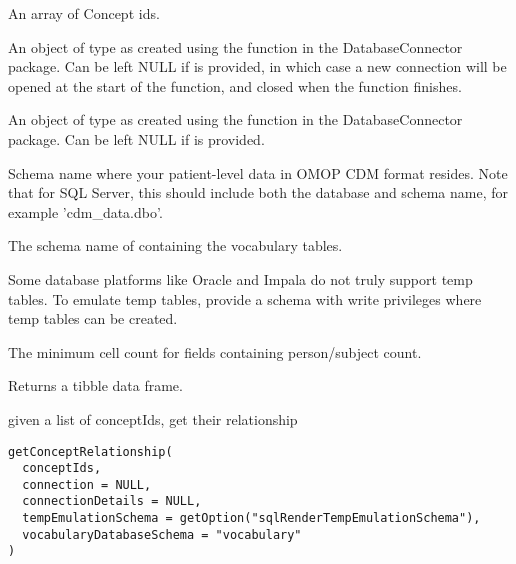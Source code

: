 \documentclass[a4paper]{book}
\begin{document}
\begin{Arguments}
\begin{ldescription}
\item[\code{conceptIds}] An array of Concept ids.

\item[\code{connection}] An object of type  as created using the
 function in the
DatabaseConnector package. Can be left NULL if 
is provided, in which case a new connection will be opened at the start
of the function, and closed when the function finishes.

\item[\code{connectionDetails}] An object of type  as created using the
 function in the
DatabaseConnector package. Can be left NULL if  is
provided.

\item[\code{cdmDatabaseSchema}] Schema name where your patient-level data in OMOP CDM format resides.
Note that for SQL Server, this should include both the database and
schema name, for example 'cdm\_data.dbo'.

\item[\code{vocabularyDatabaseSchema}] The schema name of containing the vocabulary tables.

\item[\code{tempEmulationSchema}] Some database platforms like Oracle and Impala do not truly support temp tables. To emulate temp 
tables, provide a schema with write privileges where temp tables can be created.

\item[\code{minCellCount}] The minimum cell count for fields containing person/subject count.
\end{ldescription}
\end{Arguments}
%
\begin{Value}
Returns a tibble data frame.
\end{Value}
%
\begin{Description}\relax
given a list of conceptIds, get their relationship
\end{Description}
%
\begin{Usage}
\begin{verbatim}
getConceptRelationship(
  conceptIds,
  connection = NULL,
  connectionDetails = NULL,
  tempEmulationSchema = getOption("sqlRenderTempEmulationSchema"),
  vocabularyDatabaseSchema = "vocabulary"
)
\end{verbatim}
\end{Usage}
\end{document}
